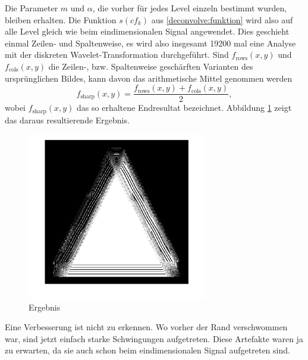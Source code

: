 Die Parameter $m$ und $\alpha$, die vorher für jedes Level einzeln bestimmt wurden, bleiben erhalten.
Die Funktion $s(cf_k)$ aus \eqref{deconvolve:funktion} wird also auf alle Level gleich wie beim eindimensionalen Signal angewendet.
Dies geschieht einmal Zeilen- und Spaltenweise, es wird also insgesamt 19200 mal eine Analyse mit der diskreten Wavelet-Transformation durchgeführt.
Sind $f_\text{rows}(x,y)$ und $f_\text{cols}(x,y)$ die Zeilen-, bzw. Spaltenweise \glqq geschärften\grqq{} Varianten des ursprünglichen Bildes, kann davon das arithmetische Mittel genommen werden
$$f_\text{sharp}(x,y)=\frac{f_\text{rows}(x,y)+f_\text{cols}(x,y)}{2},$$
wobei $f_\text{sharp}(x,y)$ das so erhaltene Endresultat bezeichnet.
Abbildung \ref{deconvolve:ergebnis} zeigt das daraus resultierende Ergebnis.
\begin{figure}[h]
\centering
\includegraphics[width=0.7\textwidth]{./papers/deconvolve/pictures/dreieck_sharp.png}
\caption{Ergebnis\label{deconvolve:ergebnis}}
\end{figure}
 
Eine Verbesserung ist nicht zu erkennen. Wo vorher der Rand verschwommen war, sind jetzt einfach starke Schwingungen aufgetreten.
Diese Artefakte waren ja zu erwarten, da sie auch schon beim eindimensionalen Signal aufgetreten sind.